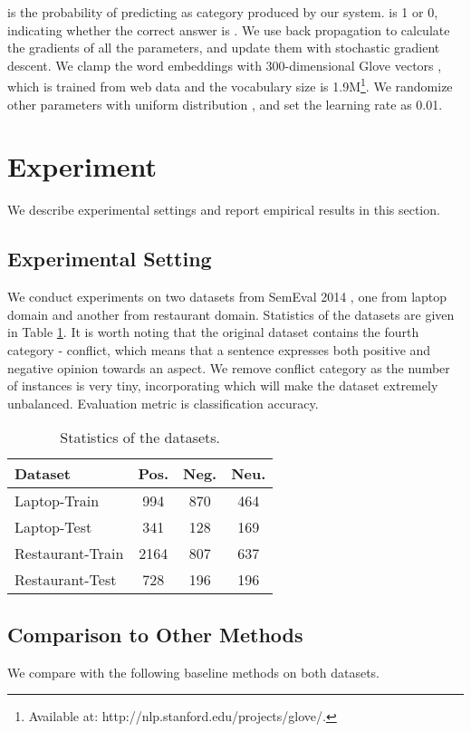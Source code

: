 \documentclass[11pt,letterpaper]{article}
\begin{document}
 is the probability of predicting  as category  produced by our system. 
 is 1 or 0, indicating whether the correct answer is .
We use back propagation to calculate the gradients of all the parameters, 
and update them with stochastic gradient descent. 
We clamp the word embeddings with 300-dimensional Glove vectors \cite{Pennington2014}, which is trained from web data and the vocabulary size is 1.9M\footnote{Available at: {http://nlp.stanford.edu/projects/glove/}.}.
We randomize other parameters with uniform distribution , and set the learning rate as 0.01.




\section{Experiment}
We describe experimental settings and report empirical results in this section.

\subsection{Experimental Setting}
We conduct experiments on two datasets from SemEval 2014 \cite{Pontiki2014}, one from laptop domain and another from restaurant domain. 
Statistics of the datasets are given in Table \ref{table:dataset}. {It is worth noting that the original dataset contains the fourth category - conflict, which means that a sentence expresses both positive and negative opinion towards an aspect. We remove conflict category as the number of instances is very tiny, incorporating which will make the dataset extremely unbalanced.} Evaluation metric is classification accuracy. 
\begin{table}[h]
	\centering
	\begin{tabular}{l|c|c|c}
		\hline
		Dataset & Pos. & Neg. & Neu. \\
		\hline
		Laptop-Train & 994 & 870 & 464\\
		Laptop-Test & 341 & 128 & 169\\
		Restaurant-Train & 2164& 807 & 637\\
		Restaurant-Test & 728& 196& 196\\
		\hline
	\end{tabular}
	\caption{Statistics of the datasets.}
	\label{table:dataset}
\end{table}








\subsection{Comparison to Other Methods}
We compare with the following baseline methods on both datasets.
\end{document}
